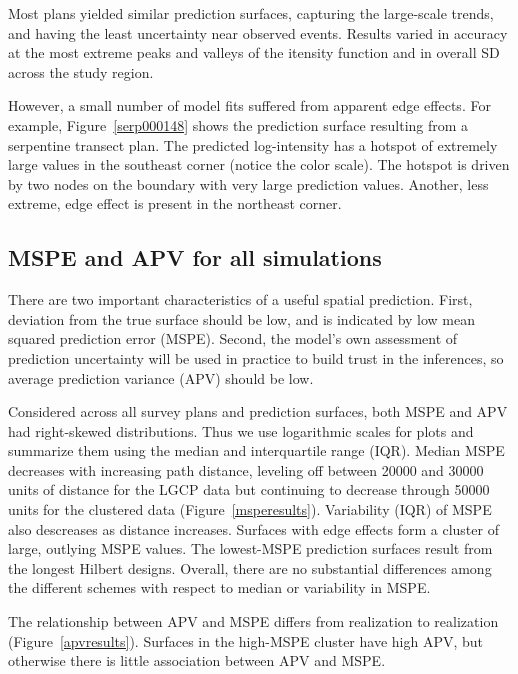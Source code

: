\documentclass[review]{elsarticle}
\begin{document}
Most plans yielded similar prediction surfaces, capturing the large-scale
trends, and having the least uncertainty near observed events. Results varied
in accuracy at the most extreme peaks and valleys of the itensity function and
in overall SD across the study region.

However, a small number of model fits suffered from apparent edge effects.
For example, Figure~\ref{serp000148} shows the prediction surface resulting
from a serpentine transect plan. The predicted log-intensity has a hotspot of
extremely large values in the southeast corner (notice the color scale). The
hotspot is driven by two nodes on the boundary with very large prediction
values. Another, less extreme, edge effect is present in the northeast corner.


\subsection{MSPE and APV for all simulations}

There are two important characteristics of a useful spatial prediction. First,
deviation from the true surface should be low, and is indicated by low
mean squared prediction error (MSPE). Second, the model's own assessment of
prediction uncertainty will be used in practice to build trust in the
inferences, so average prediction variance (APV) should be low.

Considered across all survey plans and prediction surfaces, both MSPE and APV
had right-skewed distributions. Thus we use logarithmic scales for plots and
summarize them using the median and interquartile range (IQR). Median MSPE
decreases with increasing path distance, leveling off between 20000 and 30000
units of distance for the LGCP data but continuing to decrease through 50000
units for the clustered data (Figure~\ref{msperesults}). Variability (IQR) of
MSPE also descreases as distance increases. Surfaces with edge effects form a
cluster of large, outlying MSPE values. The lowest-MSPE prediction surfaces
result from the longest Hilbert designs. Overall, there are no substantial
differences among the different schemes with respect to median or variability
in MSPE.

The relationship between APV and MSPE differs from realization to realization
(Figure~\ref{apvresults}). Surfaces in the high-MSPE cluster have high APV, but
otherwise there is little association between APV and MSPE.
\end{document}
